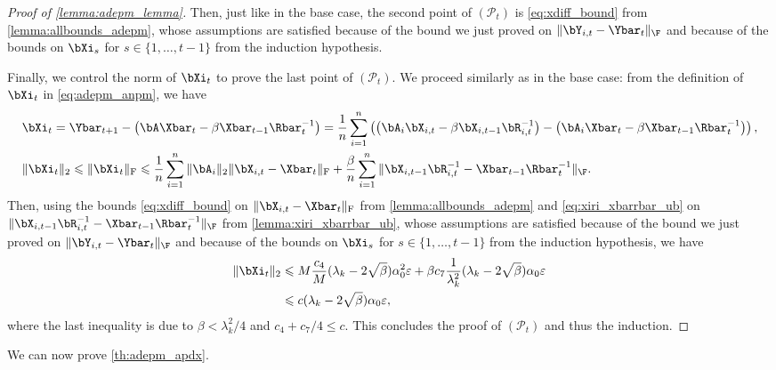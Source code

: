 \documentclass{article}
\theoremstyle{plain}
\theoremstyle{definition}
\theoremstyle{remark}
\begin{document}
\begin{proof}[Proof of \cref{lemma:adepm_lemma}]
  Then, just like in the base case, the second point of $(\mathcal{P}_t)$ is  \eqref{eq:xdiff_bound} from \cref{lemma:allbounds_adepm}, whose assumptions are satisfied because of the bound we just proved on $\Vert \bY_{i,t} - \Ybar_t \Vert_\F$ and because of the bounds on $\bXi_s$ for $s \in \{1, \dots, t-1\}$ from the induction hypothesis.

  Finally, we control the norm of $\bXi_t$ to prove the last point of $(\mathcal{P}_t)$. We proceed similarly as in the base case: from the definition of $\bXi_t$ in \eqref{eq:adepm_anpm}, we have
  \begin{align*}
    & \bXi_t = \Ybar_{t+1} - \left( \bA \Xbar_t - \beta \Xbar_{t-1} \Rbar_t^{-1} \right) = \frac{1}{n} \sum_{i=1}^n \left( \left(\bA_i\bX_{i,t} - \beta \bX_{i,t-1} \bR_{i,t}^{-1} \right) - \left( \bA_i \Xbar_t - \beta \Xbar_{t-1} \Rbar_t^{-1} \right)\right), \\
    & \Vert\bXi_t\Vert_2 \leqslant \Vert\bXi_t\Vert_\mathrm{F} \leqslant \frac{1}{n}\sum_{i=1}^n \Vert\bA_i\Vert_2 \Vert \bX_{i,t} - \Xbar_t \Vert_\mathrm{F} + \frac{\beta}{n}\sum_{i=1}^{n} \Vert\bX_{i,t-1}\bR_{i,t}^{-1} - \Xbar_{t-1} \Rbar_t^{-1} \Vert_\F.
  \end{align*}
  Then, using the bounds \eqref{eq:xdiff_bound} on $\Vert \bX_{i,t} - \Xbar_t \Vert_\mathrm{F}$ from \cref{lemma:allbounds_adepm} and \eqref{eq:xiri_xbarrbar_ub} on $\Vert\bX_{i,t-1}\bR_{i,t}^{-1} - \Xbar_{t-1} \Rbar_t^{-1} \Vert_\F$ from \cref{lemma:xiri_xbarrbar_ub}, whose assumptions are satisfied because of the bound we just proved on $\Vert \bY_{i,t} - \Ybar_t \Vert_\F$ and because of the bounds on $\bXi_s$ for $s \in \{1, \dots, t-1\}$ from the induction hypothesis, we have
  \begin{align*}
    \Vert \bXi_t \Vert_2 & \leqslant M \frac{c_4}{M} (\lambda_k-2\sqrt{\beta})\alpha_0^2\varepsilon + \beta c_7 \frac{1}{\lambda_k^2} (\lambda_k - 2\sqrt{\beta}) \alpha_0 \varepsilon \\
    & \leqslant c (\lambda_k - 2\sqrt{\beta}) \alpha_0 \varepsilon,
  \end{align*}
  where the last inequality is due to $\beta < \lambda_k^2/4$ and $c_4 + c_7/4 \leqslant c$. This concludes the proof of $(\mathcal{P}_t)$ and thus the induction.

\end{proof}





We can now prove \cref{th:adepm_apdx}.
\end{document}
